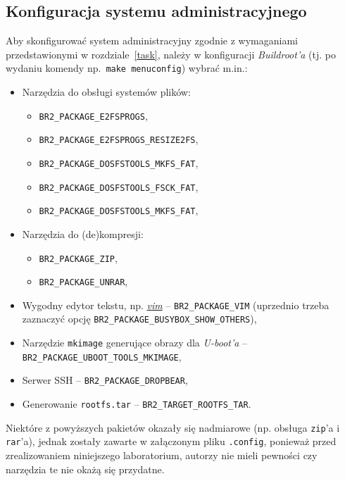 \documentclass{article}
\begin{document}

\subsection{Konfiguracja systemu administracyjnego}

Aby skonfigurować system administracyjny zgodnie z wymaganiami przedstawionymi w rozdziale~\ref{task}, należy w konfiguracji \emph{Buildroot'a} (tj. po wydaniu komendy np.~\texttt{make menuconfig}) wybrać m.in.:
\begin{itemize}
	\item Narzędzia do obsługi systemów plików:
	\begin{itemize}
		\item \texttt{BR2\_PACKAGE\_E2FSPROGS},
		\item \texttt{BR2\_PACKAGE\_E2FSPROGS\_RESIZE2FS},
		\item \texttt{BR2\_PACKAGE\_DOSFSTOOLS\_MKFS\_FAT},
		\item \texttt{BR2\_PACKAGE\_DOSFSTOOLS\_FSCK\_FAT},
		\item \texttt{BR2\_PACKAGE\_DOSFSTOOLS\_MKFS\_FAT},
	\end{itemize}
	\item Narzędzia do (de)kompresji:
	\begin{itemize}
		\item \texttt{BR2\_PACKAGE\_ZIP},
		\item \texttt{BR2\_PACKAGE\_UNRAR},
	\end{itemize}
	\item Wygodny edytor tekstu, np. \href{http://www.vim.org/}{\emph{vim}} -- \texttt{BR2\_PACKAGE\_VIM} (uprzednio trzeba zaznaczyć opcję \texttt{BR2\_PACKAGE\_BUSYBOX\_SHOW\_OTHERS}),
	\item Narzędzie \texttt{mkimage} generujące obrazy dla \emph{U-boot'a} -- \texttt{BR2\_PACKAGE\_UBOOT\_TOOLS\_MKIMAGE},
	\item Serwer SSH -- \texttt{BR2\_PACKAGE\_DROPBEAR},
	\item Generowanie \texttt{rootfs.tar} -- \texttt{BR2\_TARGET\_ROOTFS\_TAR}.
\end{itemize}
Niektóre z powyższych pakietów okazały się nadmiarowe (np. obsługa \texttt{zip}'a i \texttt{rar}'a), jednak zostały zawarte w załączonym pliku \texttt{.config}, ponieważ przed zrealizowaniem niniejszego laboratorium, autorzy nie mieli pewności czy narzędzia te nie okażą się przydatne.
\end{document}
